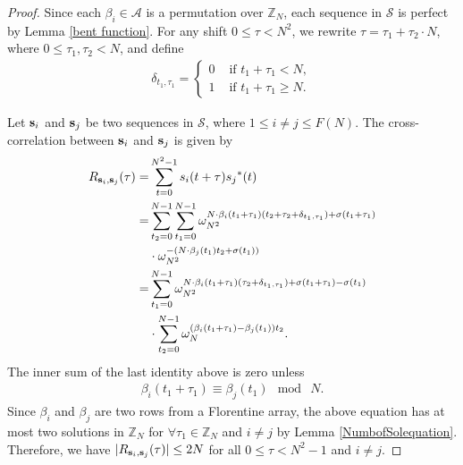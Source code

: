 \documentclass[conference,letterpaper]{IEEEtran}
\theoremstyle{definition}
\begin{document}
\begin{proof}
Since each $ \beta_i \in \mathcal{A} $ is a permutation over $\mathbb{Z}_{N}$, each sequence in $\mathcal{S}$ is perfect by Lemma \ref{bent function}. 
For any shift $0\leq \tau< N^2$, we rewrite $\tau=\tau_1+\tau_2\cdot N$, where $0 \leq \tau_1, \tau_2 < N$, and
define
\begin{eqnarray*}\label{eqn_delta}
\delta_{t_{1}, \tau_1}=\left\{ \begin{array}{ll}
0& \mbox{~if~} t_1+\tau_1<N, \\
1&\mbox{~if~} t_1+\tau_1 \geq N.
\end{array}
\right.
\end{eqnarray*}

 Let ${\bf s}_{i}$ and ${\bf s}_{j}$ be two  sequences in $\mathcal{S}$, where  $1 \leq i \neq j \leq F(N)$. The cross-correlation between ${\bf s}_{i}$ and ${\bf s}_{j}$ is given by
\begin{equation*} \label{the-main-proof}
\begin{aligned}
R_{{\bf s}_{i},{\bf s}_{j}}(\tau) = & \sum_{t=0}^{N^2-1}s_{i}(t+\tau){s_{j}}^*(t)\\
 = &\sum\limits_{t_{2}=0}^{N-1} \sum\limits_{t_{1}=0}^{N-1}
               \omega_{N^2}^{N \cdot \beta_{i}(t_{1}+\tau_1)(t_{2}+\tau_2+\delta_{t_{1}, \tau_1}) + \sigma( t_{1}+\tau_1) } \\    
              & \cdot \omega_{N^2}^{- (N \cdot \beta_{j}(t_{1}) t_{2} + \sigma(t_{1}))}\\
                =  &\sum\limits_{t_{1}=0}^{N-1} \omega_{N^2}^{ N \cdot \beta_{i}(t_{1}+\tau_1)(\tau_2+\delta_{t_{1}, \tau_1})+ \sigma(t_{1}+\tau_1)-\sigma(t_{1})}   \\
  & \cdot \sum\limits_{t_{2}=0}^{N-1} \omega_{N}^{(\beta_{i}( t_{1}+\tau_1) -\beta_{j}(t_{1})) t_{2}}.
\end{aligned}
\end{equation*}
The inner sum of the last identity above is zero unless
\begin{eqnarray*}\label{pifunction}
\beta_{i}(t_{1}+\tau_1) \equiv \beta_{j}(t_{1}) ~ \bmod ~N.
\end{eqnarray*}
Since $\beta_{i}$ and $\beta_{j}$  are two rows from a Florentine array, the above equation has at most two solutions in
$\mathbb{Z}_{N}$  for   $\forall \tau_1 \in \mathbb{Z}_{N}$ and $ i \neq j$   by Lemma \ref{NumbofSolequation}. Therefore, we have $\vert R_{{\bf s}_{i},{\bf s}_{j}}(\tau)  \vert \leq 2N$ for all $0 \leq  \tau < N^2-1$ and  $ i \neq j $.
\end{proof}
\end{document}
